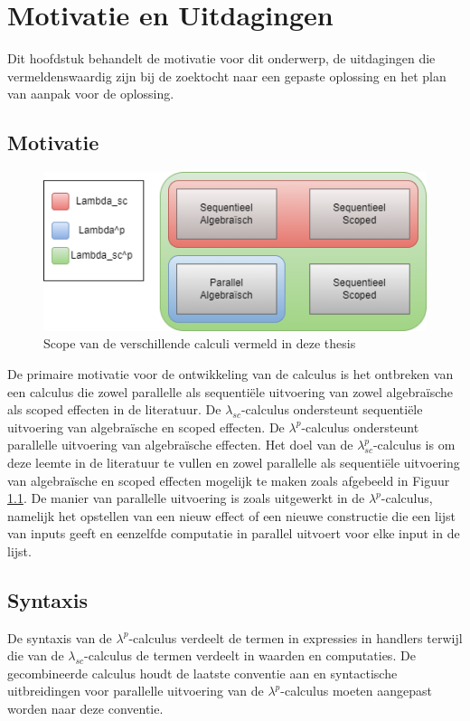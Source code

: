 \chapter{Motivatie en Uitdagingen}
\label{hoofdstuk:motivatie}
Dit hoofdstuk behandelt de motivatie voor dit onderwerp, de uitdagingen die vermeldenswaardig zijn bij de zoektocht naar een gepaste oplossing en het plan van aanpak voor de oplossing.

\section{Motivatie}

\begin{figure}
    \centering
    \includegraphics[width=\textwidth]{Media/scope.png}
    \caption{Scope van de verschillende calculi vermeld in deze thesis}
    \label{fig:motiv}
\end{figure}

De primaire motivatie voor de ontwikkeling van de calculus is het ontbreken van een calculus die zowel parallelle als sequentiële uitvoering van zowel algebraïsche als scoped effecten in de literatuur. De $\lambda_{sc}$-calculus \cite{Bosman2022} ondersteunt sequentiële uitvoering van algebraïsche en scoped effecten. De $\lambda^{p}$-calculus ondersteunt parallelle uitvoering van algebraïsche effecten. Het doel van de $\lambda_{sc}^{p}$-calculus is om deze leemte in de literatuur te vullen en zowel parallelle als sequentiële uitvoering van algebraïsche en scoped effecten mogelijk te maken zoals afgebeeld in Figuur \ref{fig:motiv}. \newline
De manier van parallelle uitvoering is zoals uitgewerkt in de $\lambda^p$-calculus, namelijk het opstellen van een nieuw effect of een nieuwe constructie die een lijst van inputs geeft en eenzelfde computatie in parallel uitvoert voor elke input in de lijst. 

\section{Syntaxis}
De syntaxis van de $\lambda^p$-calculus verdeelt de termen in expressies in handlers terwijl die van de $\lambda_{sc}$-calculus de termen verdeelt in waarden en computaties. De gecombineerde calculus houdt de laatste conventie aan en syntactische uitbreidingen voor parallelle uitvoering van de $\lambda^p$-calculus moeten aangepast worden naar deze conventie.

